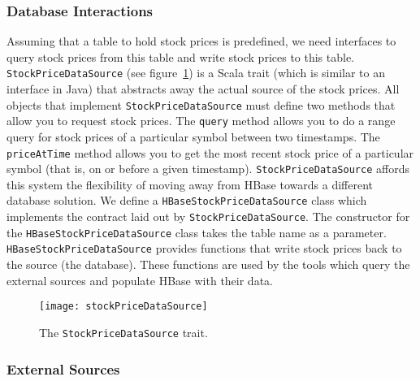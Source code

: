 \subsubsection{Database Interactions}

Assuming that a table to hold stock prices is predefined, we need interfaces to query stock prices from this table and write stock prices to this table.
\texttt{StockPriceDataSource} (see figure~\ref{stockPriceDataSource}) is a Scala trait (which is similar to an interface in Java) that abstracts away the actual source of the stock prices.
All objects that implement \texttt{StockPriceDataSource} must define two methods that allow you to request stock prices.
The \texttt{query} method allows you to do a range query for stock prices of a particular symbol between two timestamps.
The \texttt{priceAtTime} method allows you to get the most recent stock price of a particular symbol (that is, on or before a given timestamp).
\texttt{StockPriceDataSource} affords this system the flexibility of moving away from HBase towards a different database solution.
We define a \texttt{HBaseStockPriceDataSource} class which implements the contract laid out by \texttt{StockPriceDataSource}.
The constructor for the \texttt{HBaseStockPriceDataSource} class takes the table name as a parameter.
\texttt{HBaseStockPriceDataSource} provides functions that write stock prices back to the source (the database).
These functions are used by the tools which query the external sources and populate HBase with their data.

\begin{figure}[h]
  \label{stockPriceDataSource}
  \begin{center}
    \texttt{[image: stockPriceDataSource]}
  \end{center}
  \caption{The \texttt{StockPriceDataSource} trait.}
\end{figure}

\subsubsection{External Sources}

